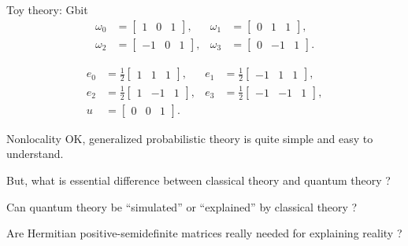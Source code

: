 \documentclass{beamer}
\theoremstyle{definition}
\begin{document}
\begin{frame}{Toy theory: Gbit}
\vspace{-1em}
\begin{align*}
\omega_0&=\begin{bmatrix} 1& 0& 1\end{bmatrix},&
\omega_1&=\begin{bmatrix} 0& 1& 1\end{bmatrix},\\
\omega_2&=\begin{bmatrix} -1& 0& 1\end{bmatrix},&
\omega_3&=\begin{bmatrix} 0& -1& 1\end{bmatrix}.
\end{align*}

\vspace{-1em}
\begin{align*}
e_0&=\frac12\begin{bmatrix} 1& 1& 1\end{bmatrix},&
e_1&=\frac12\begin{bmatrix} -1& 1& 1\end{bmatrix},\\
e_2&=\frac12\begin{bmatrix} 1& -1& 1\end{bmatrix},&
e_3&=\frac12\begin{bmatrix} -1& -1& 1\end{bmatrix},\\
u&=\begin{bmatrix} 0& 0& 1\end{bmatrix}.
\end{align*}
\end{frame}

\begin{frame}{Nonlocality}
\centering
OK, generalized probabilistic theory is quite simple and easy to understand.

\vspace{2em}
But, what is essential difference between classical theory and quantum theory ?

\vspace{2em}
Can quantum theory be ``simulated'' or ``explained'' by classical theory ?

\vspace{2em}
Are Hermitian positive-semidefinite matrices really needed for explaining reality ?
\end{frame}

\end{document}
